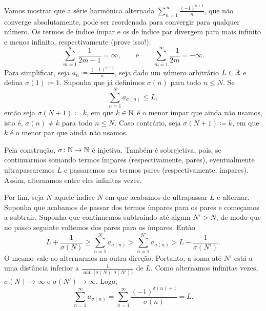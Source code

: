 \begin{example} \label{example:harmonsumanything}
Vamos mostrar que a série harmônica alternada
$\sum_{n=1}^\infty \frac{{(-1)}^{n+1}}{n}$, que não converge absolutamente, pode ser
reordenada para convergir para qualquer número.
Os termos de índice ímpar e os de índice par divergem para
mais infinito e menos infinito, respectivamente (prove isso!):
\begin{equation*}
\sum_{m=1}^\infty \frac{1}{2m-1} = \infty, \qquad \text{e} \qquad
\sum_{m=1}^\infty \frac{-1}{2m} = -\infty .
\end{equation*}
Para simplificar, seja $a_n \coloneqq \frac{{(-1)}^{n+1}}{n}$,
seja dado um número arbitrário $L \in {\mathbb{R}}$ e defina $\sigma(1) \coloneqq 1$.
Suponha que já definimos $\sigma(n)$ para todo $n \leq N$. Se
\begin{equation*}
\sum_{n=1}^N a_{\sigma(n)} \leq L ,
\end{equation*}
então seja $\sigma(N+1) \coloneqq k$, em que $k \in {\mathbb{N}}$ é o menor ímpar
que ainda não usamos, isto é, $\sigma(n) \neq k$ para todo $n \leq N$.
Caso contrário, seja $\sigma(N+1) \coloneqq k$, em que $k$ é o menor par
que ainda não usamos.

Pela construção, $\sigma \colon {\mathbb{N}} \to {\mathbb{N}}$ é injetiva.
Também é sobrejetiva, pois, se continuarmos somando termos ímpares (respectivamente,
pares), eventualmente ultrapassaremos $L$ e passaremos aos termos pares
(respectivamente, ímpares). Assim, alternamos entre eles infinitas vezes.

Por fim, seja $N$ aquele índice $N$ em que acabamos de ultrapassar $L$ e alternar.
Suponha que acabamos de passar dos termos ímpares para os pares e começamos
a subtrair.
Suponha que continuemos subtraindo até algum
$N' > N$, de modo que no passo seguinte voltemos dos pares para os ímpares.
Então
\begin{equation*}
L + \frac{1}{\sigma(N)} \geq \sum_{n=1}^{N} a_{\sigma(n)}
> \sum_{n=1}^{N'} a_{\sigma(n)} > L- \frac{1}{\sigma(N')}.
\end{equation*}
O mesmo vale ao alternarmos na outra direção.
Portanto, a soma até $N'$ está a uma distância inferior a
$\frac{1}{\min \{ \sigma(N), \sigma(N') \}}$ de $L$. Como
alternamos infinitas vezes, $\sigma(N) \to \infty$
e $\sigma(N') \to \infty$. Logo,
\begin{equation*}
\sum_{n=1}^\infty a_{\sigma(n)} = 
\sum_{n=1}^\infty \frac{{(-1)}^{\sigma(n)+1}}{\sigma(n)} = L .
\end{equation*}


\end{example}
